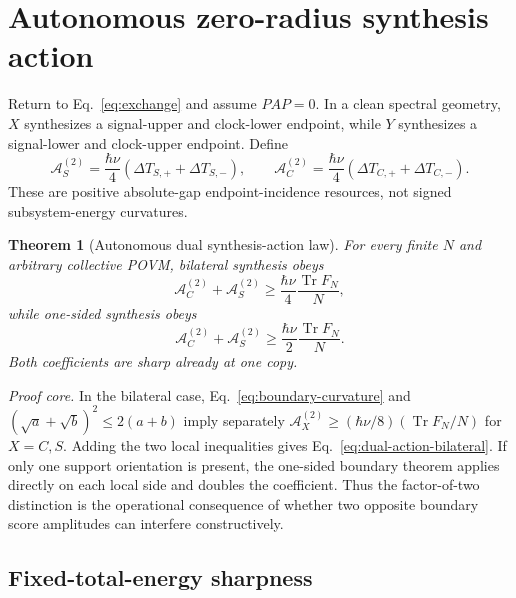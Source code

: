 \documentclass[aps,pra,preprint,nofootinbib]{revtex4-2}
\newtheorem{theorem}{Theorem}
\newcommand{\Tr}{\operatorname{Tr}}
\newcommand{\Fcl}{F}
\newcommand{\Aact}{\mathcal A}
\begin{document}
\section{Autonomous zero-radius synthesis action}
\label{sec:autonomous-action}

Return to Eq.~\eqref{eq:exchange} and assume $PAP=0$. In a clean spectral geometry, $X$ synthesizes a signal-upper and clock-lower endpoint, while $Y$ synthesizes a signal-lower and clock-upper endpoint. Define
\begin{equation}
\Aact_S^{(2)}=\frac{\hbar\nu}{4}(\Delta T_{S,+}+\Delta T_{S,-}),
\qquad
\Aact_C^{(2)}=\frac{\hbar\nu}{4}(\Delta T_{C,+}+\Delta T_{C,-}).
\label{eq:local-actions}
\end{equation}
These are positive absolute-gap endpoint-incidence resources, not signed subsystem-energy curvatures.

\begin{theorem}[Autonomous dual synthesis-action law]
\label{thm:dual-action}
For every finite $N$ and arbitrary collective POVM, bilateral synthesis obeys
\begin{equation}
\boxed{
\Aact_C^{(2)}+\Aact_S^{(2)}
\ge
\frac{\hbar\nu}{4}\frac{\Tr \Fcl_N}{N},
}
\label{eq:dual-action-bilateral}
\end{equation}
while one-sided synthesis obeys
\begin{equation}
\boxed{
\Aact_C^{(2)}+\Aact_S^{(2)}
\ge
\frac{\hbar\nu}{2}\frac{\Tr \Fcl_N}{N}.
}
\label{eq:dual-action-one-sided}
\end{equation}
Both coefficients are sharp already at one copy.
\end{theorem}

\emph{Proof core.} In the bilateral case, Eq.~\eqref{eq:boundary-curvature} and $(\sqrt a+\sqrt b)^2\le2(a+b)$ imply separately $\Aact_X^{(2)}\ge(\hbar\nu/8)(\Tr F_N/N)$ for $X=C,S$. Adding the two local inequalities gives Eq.~\eqref{eq:dual-action-bilateral}. If only one support orientation is present, the one-sided boundary theorem applies directly on each local side and doubles the coefficient. Thus the factor-of-two distinction is the operational consequence of whether two opposite boundary score amplitudes can interfere constructively.

\subsection{Fixed-total-energy sharpness}
\end{document}
